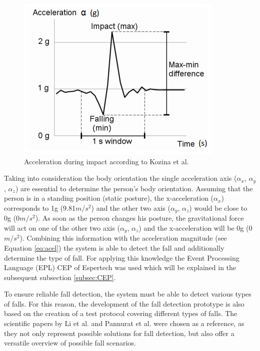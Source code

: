 \documentclass[review]{elsarticle}
\begin{document}
\begin{figure}[!ht]
	\centering
	\includegraphics[scale=1]{Images/KozinaImpact}
	\caption[Acceleration during impact]{Acceleration during impact according to Kozina et al. ~\cite{Kozina}}
	\label{fig:fallKozina}
\end{figure}
Taking into consideration the body orientation the single acceleration axis ($\alpha_x$, $\alpha_y$, $\alpha_z$) are essential to determine the person's body orientation. Assuming that the person is in a standing position (static posture), the x-acceleration ($\alpha_x$) corresponds to 1g (9.81$m/s^{2}$) and the other two axis ($\alpha_y$, $\alpha_z$) would be close to 0g (0$m/s^{2}$). As soon as the person changes his posture, the gravitational force will act on one of the other two axis ($\alpha_y$, $\alpha_z$) and the x-acceleration will be 0g (0$m/s^{2}$). Combining this information with the acceleration magnitude (see Equation \ref{eq:acel}) the system is able to detect the fall and additionally determine the type of fall. For applying this knowledge the Event Processing Language (EPL) CEP of Espertech \cite{Esper:2016} was used which will be explained in the subsequent subsection \ref{subsec:CEP}.

To ensure reliable fall detection, the system must be able to detect various types of falls. For this reason, the development of the fall detection prototype is also based on the creation of a test protocol covering different types of falls. The scientific papers by Li et al. \cite{Li2009} and Pannurat et al. \cite{Pannurat2014} were chosen as a reference, as they not only represent possible solutions for fall detection, but also offer a versatile overview of possible fall scenarios.
\end{document}

